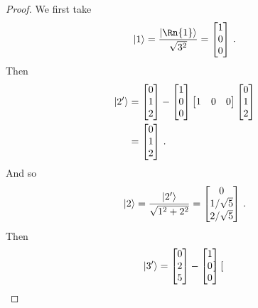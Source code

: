 \begin{proof}
We first take 
\begin{equation}
    \ket{1} = \frac{\ket{\Rn{1}}}{\sqrt{3^2}} = 
    \begin{bmatrix}
    1 \\
    0 \\
    0
    \end{bmatrix}\,.
\end{equation}
Then
\begin{align}
    \ket{2'} &= 
    \begin{bmatrix}
    0 \\
    1 \\
    2
    \end{bmatrix}
    -
    \begin{bmatrix}
    1 \\
    0 \\
    0
    \end{bmatrix}
    \begin{bmatrix}
    1 & 0 & 0
    \end{bmatrix}
    \begin{bmatrix}
    0 \\
    1 \\
    2
    \end{bmatrix} \\
    &=
    \begin{bmatrix}
    0 \\
    1 \\
    2
    \end{bmatrix}\,.
\end{align}
And so
\begin{align}
    \ket{2} = \frac{\ket{2'}}{\sqrt{1^2 + 2^2}} = 
    \begin{bmatrix}
    0 \\
    1/\sqrt{5} \\
    2/\sqrt{5}
    \end{bmatrix}\,.
\end{align}
Then
\begin{align}
    \ket{3'} = 
    \begin{bmatrix}
    0 \\
    2 \\
    5
    \end{bmatrix}
    &-
    \begin{bmatrix}
    1 \\
    0 \\
    0
    \end{bmatrix}
    \begin{bmatrix}

\end{bmatrix}
\end{align}
\end{proof}
